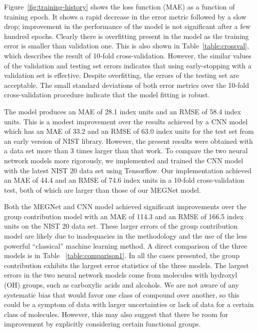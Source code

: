 \documentclass{IEEEcsmag}
\begin{document}
Figure~\ref{fig:training-history} shows the loss function (MAE) as a function of training epoch. It shows a rapid decrease in the error metric followed by a slow drop; improvement in the performance of the model is not significant after a few hundred epochs. Clearly there is overfitting present in the model as the training error is smaller than validation one. This is also shown in Table~\ref{table:crossval}, which describes the result of 10-fold cross-validation. However, the similar values of the validation and testing set errors indicates that using early-stopping with a validation set is effective. Despite overfitting, the errors of the testing set are acceptable.
The small standard deviations of both error metrics over the 10-fold cross-validation procedure indicate that the model fitting is robust.

The model produces an MAE of 28.1 index units and an RMSE of 58.4 index units. This is a modest improvement over the results achieved by a CNN model \cite{2019Matyushin} which has an MAE of 33.2 and an RMSE of 63.0 index units for the test set from an early version of NIST library.
However, the present results were obtained with a data set more than 3 times larger than that work. To compare the two neural network models more rigorously, we implemented and trained the CNN model with the latest NIST 20 data set using Tensorflow. Our implementation achieved an MAE of 44.4 and an RMSE of 74.6 index units in a 10-fold cross-validation test, both of which are larger than those of our MEGNet model.

Both the MEGNet and CNN model achieved significant improvements over the group contribution model with an MAE of 114.3 and an RMSE of 166.5 index units on the NIST 20 data set. These larger errors of the group contribution model are likely due to inadequacies in the methodology and the use of the less powerful ``classical'' machine learning method. A direct comparison of the three models is in Table~ \ref{table:comparison1}. In all the cases presented, the group contribution exhibits the largest error statistics of the three models.
The largest errors in the two neural network models come from molecules with hydroxyl (OH) groups, such as carboxylic acids and alcohols. We are not aware of any systematic bias that would favor one class of compound over another, so this could be a symptom of data with larger uncertainties or lack of data for a certain class of molecules.
However, this may also suggest that there be room for improvement by explicitly considering certain functional groups.
\end{document}

